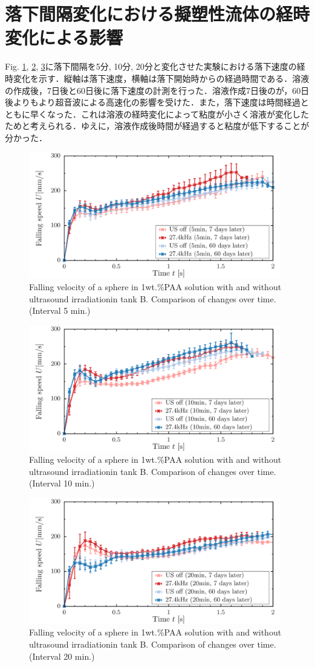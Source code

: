 \section{落下間隔変化における擬塑性流体の経時変化による影響}

Fig. \ref{fig:falling-5-2}, \ref{fig:falling-10-2}, \ref{fig:falling-20-2}に落下間隔を5分, 10分, 20分と変化させた実験における落下速度の経時変化を示す．縦軸は落下速度，横軸は落下開始時からの経過時間である．溶液の作成後，7日後と60日後に落下速度の計測を行った．溶液作成7日後のが，60日後よりもより超音波による高速化の影響を受けた．また，落下速度は時間経過とともに早くなった．これは溶液の経時変化によって粘度が小さく溶液が変化したためと考えられる．ゆえに，溶液作成後時間が経過すると粘度が低下することが分かった．

\begin{figure}[H]
    \centering
    \includegraphics[width=11cm,clip]{X-Appendix/5.png}
    \caption{Falling velocity of a sphere in 1wt.\%PAA solution with and without ultrasound irradiationin tank B. Comparison of changes over time. (Interval 5 min.)}
    \label{fig:falling-5-2}
\end{figure}
\begin{figure}[H]
    \centering
    \includegraphics[width=11cm,clip]{X-Appendix/10.png}
    \caption{Falling velocity of a sphere in 1wt.\%PAA solution with and without ultrasound irradiationin tank B. Comparison of changes over time. (Interval 10 min.)}
    \label{fig:falling-10-2}
\end{figure}
\begin{figure}[H]
    \centering
    \includegraphics[width=11cm,clip]{X-Appendix/20.png}
    \caption{Falling velocity of a sphere in 1wt.\%PAA solution with and without ultrasound irradiationin tank B. Comparison of changes over time. (Interval 20 min.)}
    \label{fig:falling-20-2}
\end{figure}
